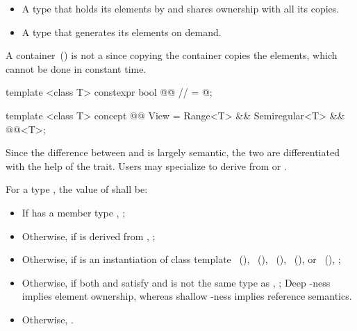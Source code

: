{\begin{itemize}
\item A  type that holds its elements by 
and shares ownership with all its copies.

\item A  type that generates its elements on demand.
\end{itemize}

A container~() is not a  since copying the
container copies the elements, which cannot be done in constant time.
\exitexample

\begin{itemdecl}
template <class T>
constexpr bool @@ // \expos
  = @\seebelow@;

template <class T>
concept @@ View =
  Range<T> &&
  Semiregular<T> &&
  @@<T>;
\end{itemdecl}

\begin{itemdescr}
\pnum
Since the difference between  and  is largely semantic, the
two are differentiated with the help of the 
trait. Users may specialize 
to derive from  or .

\pnum
For a type , the value of  shall be:
\begin{itemize}
\item If  has a member type , ;
\item Otherwise, if  is derived from , ;
\item Otherwise, if  is an instantiation of class template
~(),
~(),
~(),
~(), or
~(), ;
\item Otherwise, if both  and  satisfy  and
 is not the same type as ,
; \enternote Deep -ness implies element ownership, whereas shallow -ness
implies reference semantics. \exitnote
\item Otherwise, .
\end{itemize}
\end{itemdescr}

}
